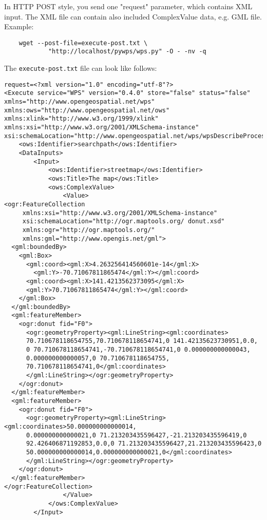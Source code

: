 \documentclass[a4paper,11pt]{article}
\begin{document}
    In HTTP POST style, you send one "request" parameter, which contains XML input. The XML file can contain also included ComplexValue data, e.g. GML file. Example:
     
    \begin{verbatim}
    wget --post-file=execute-post.txt \
            "http://localhost/pywps/wps.py" -O - -nv -q
    \end{verbatim}
     
    The \texttt{execute-post.txt} file can look like follows:
    \begin{verbatim}
request=<?xml version="1.0" encoding="utf-8"?>
<Execute service="WPS" version="0.4.0" store="false" status="false"
xmlns="http://www.opengeospatial.net/wps"
xmlns:ows="http://www.opengeospatial.net/ows"
xmlns:xlink="http://www.w3.org/1999/xlink"
xmlns:xsi="http://www.w3.org/2001/XMLSchema-instance"
xsi:schemaLocation="http://www.opengeospatial.net/wps/wpsDescribeProcess.xsd">
    <ows:Identifier>searchpath</ows:Identifier>
    <DataInputs>
        <Input>
            <ows:Identifier>streetmap</ows:Identifier>
            <ows:Title>The map</ows:Title>
            <ows:ComplexValue>
                <Value>
<ogr:FeatureCollection
     xmlns:xsi="http://www.w3.org/2001/XMLSchema-instance"
     xsi:schemaLocation="http://ogr.maptools.org/ donut.xsd"
     xmlns:ogr="http://ogr.maptools.org/"
     xmlns:gml="http://www.opengis.net/gml">
  <gml:boundedBy>
    <gml:Box>
      <gml:coord><gml:X>4.263256414560601e-14</gml:X>
        <gml:Y>-70.71067811865474</gml:Y></gml:coord>
      <gml:coord><gml:X>141.4213562373095</gml:X>
      <gml:Y>70.71067811865474</gml:Y></gml:coord>
    </gml:Box>
  </gml:boundedBy>                      
  <gml:featureMember>
    <ogr:donut fid="F0">
      <ogr:geometryProperty><gml:LineString><gml:coordinates>
      70.710678118654755,70.710678118654741,0 141.42135623730951,0.0,
      0 70.710678118654741,-70.710678118654741,0 0.000000000000043,
      0.000000000000057,0 70.710678118654755,
      70.710678118654741,0</gml:coordinates>
      </gml:LineString></ogr:geometryProperty>
    </ogr:donut>
  </gml:featureMember>
  <gml:featureMember>
    <ogr:donut fid="F0">
      <ogr:geometryProperty><gml:LineString><gml:coordinates>50.000000000000014,
      0.000000000000021,0 71.213203435596427,-21.213203435596419,0 
      92.426406871192853,0.0,0 71.213203435596427,21.213203435596423,0 
      50.000000000000014,0.000000000000021,0</gml:coordinates>
      </gml:LineString></ogr:geometryProperty>
    </ogr:donut>
  </gml:featureMember>
</ogr:FeatureCollection>
                </Value>
            </ows:ComplexValue>
        </Input>


\end{verbatim}
\end{document}
